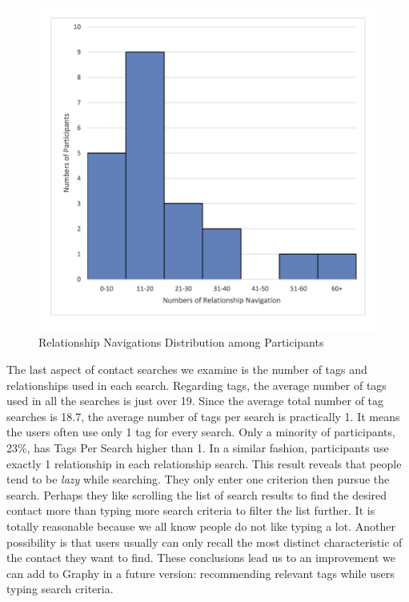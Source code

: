 \begin{figure}[!h]
\begin{centering}
\includegraphics[scale=0.68]{pics/relationship_navigation_histogram.png}
\caption{Relationship Navigations Distribution among Participants}\label{fig:relationship_navigation_histogram}
\end{centering}
\end{figure}

The last aspect of contact searches we examine is the number of tags and relationships used in each search. Regarding tags, the average number of tags used in all the searches is just over 19. Since the average total number of tag searches is 18.7, the average number of tags per search is practically 1. It means the users often use only 1 tag for every search. Only a minority of participants, 23\%, has Tags Per Search higher than 1. In a similar fashion, participants use exactly 1 relationship in each relationship search. This result reveals that people tend to be \textit{lazy} while searching. They only enter one criterion then pursue the search. Perhaps they like scrolling the list of search results to find the desired contact more than typing more search criteria to filter the list further. It is totally reasonable because we all know people do not like typing a lot. Another possibility is that users usually can only recall the most distinct characteristic of the contact they want to find. These conclusions lead us to an improvement we can add to Graphy in a future version: recommending relevant tags while users typing search criteria.

